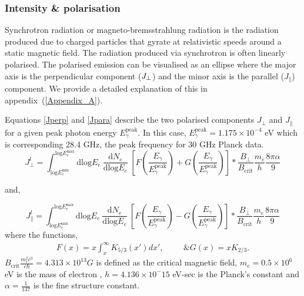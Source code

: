\documentclass[12pt, a4 paper]{article}
\begin{document}
\subsubsection{Intensity \& polarisation}
Synchrotron radiation or magneto-bremsstrahlung radiation is the radiation produced due to charged particles that gyrate at relativistic speeds around a static magnetic field. The radiation produced via synchrotron is often linearly polarised.
The polarised emission can be visualised as an ellipse where the major axis is the perpendicular component ($J_{\rm \perp}$) and the minor axis is the parallel ($J_{\parallel}$) component. We provide a detailed explanation of this in appendix~(\ref{Appendix_A}). 

Equations \ref{Jperp} and \ref{Jpara} describe the two polarised components $J_{\perp}$ and $J_{\parallel}$ for a  given peak photon energy $E_{\gamma}^{\mathrm{peak}}$. In this case, $E_{\gamma}^{\mathrm{peak}} = 1.175 \times 10^{-4}$ eV which is corresponding 28.4 GHz, the peak frequency for 30 GHz Planck data.
\begin{equation}\label{Jperp}
 {J_{\perp}^l} =   \int_{\mathrm{log}E_e^{\mathrm{min}}}^{\mathrm{log}E_e^{\mathrm{max}}}\mathrm{dlog}E_{e} \  \frac{\mathrm{d}N_e}{\mathrm{dlog}E_{e}} \  \left[F\left(\frac{E_{\gamma}}{E_{\gamma}^{\mathrm{peak}}}\right) + G\left(\frac{E_{\gamma}}{E_{\gamma}^{\mathrm{peak}}}\right)\right] * \frac{B_{\perp}}{B_{\mathrm{crit}}}\frac{m_{e}}{h} \frac{8\pi \alpha}{9} 
\end{equation}

and,

\begin{equation}\label{Jpara}
{J_{\parallel}^l} = \int_{\mathrm{log}E_e^{\mathrm{min}}}^{\mathrm{log}E_e^{\mathrm{max}}}\mathrm{dlog}E_{e} \ \frac{\mathrm{d}N_e}{\mathrm{dlog}E_{e}} \  \left[F\left(\frac{E_{\gamma}}{E_{\gamma}^{\mathrm{peak}}}\right) - G\left(\frac{E_{\gamma}}{E_{\gamma}^{\mathrm{peak}}}\right)\right] * \frac{B_{\perp}}{B_{\mathrm{crit}}}\frac{m_{e}}{h} \frac{8\pi \alpha}{9}
\end{equation}
where the functions,
\begin{align}
F(x) = x \int_x^\infty K_{5/3}(x') dx',  \hspace{1cm}  \&   G(x) = x K_{2/3}.
\end{align}
$B_{\mathrm{crit}} \frac{m_e^2c^3}{e\hbar} = 4.313 \times 10^{13} G$ is defined as the critical magnetic field, $m_e = 0.5 \times 10^6$ eV is the mass of electron , $h = 4.136 \times 10^-15$ eV-sec is the Planck's constant and $\alpha = \frac{1}{137}$ is the fine structure constant.
\end{document}
